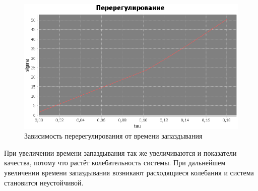 \documentclass[12pt]{article}
\begin{document}
\newpage
\begin{figure}[h!]
     \centering
    \includegraphics[width = \linewidth]{перерегулирование.png}
    \caption{Зависимость перерегулирования от времени запаздывания}
\end{figure} 
При увеличении времени запаздывания так же увеличиваются и показатели качества, потому что растёт колебательность системы. При дальнейшем увеличении времени запаздывания возникают расходящиеся колебания и система становится неустойчивой.  
\newpage
\end{document}
